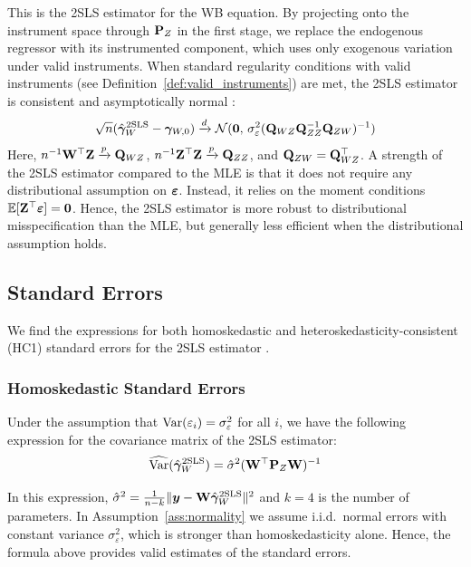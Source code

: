 This is the 2SLS estimator for the WB equation. By projecting onto the instrument space through $\mathbf{P}_Z$ in the first stage, we replace the endogenous regressor with its instrumented component, which uses only exogenous variation under valid instruments. When standard regularity conditions with valid instruments (see Definition~\ref{def:valid_instruments}) are met, the 2SLS estimator is consistent and asymptotically normal \parencite[Sec.~4.2.1]{Angrist2009}:
\begin{equation}
    \sqrt{n}(\hat{\bm{\gamma}}_W^{\text{2SLS}} - \bm{\gamma}_{W,0}) \xrightarrow{d} \mathcal{N}(\bm{0},\, \sigma_\varepsilon^2(\mathbf{Q}_{WZ}\mathbf{Q}_{ZZ}^{-1}\mathbf{Q}_{ZW})^{-1})
\end{equation}
Here, $n^{-1}\mathbf{W}^\top\mathbf{Z} \xrightarrow{p} \mathbf{Q}_{WZ}$, $n^{-1}\mathbf{Z}^\top\mathbf{Z} \xrightarrow{p} \mathbf{Q}_{ZZ}$, and $\mathbf{Q}_{ZW} = \mathbf{Q}_{WZ}^\top$. A strength of the 2SLS estimator compared to the MLE is that it does not require any distributional assumption on $\bm{\varepsilon}$. Instead, it relies on the moment conditions $\mathbb{E}[\mathbf{Z}^\top\bm{\varepsilon}] = \bm{0}$. Hence, the 2SLS estimator is more robust to distributional misspecification than the MLE, but generally less efficient when the distributional assumption holds.

\subsection{Standard Errors}

We find the expressions for both homoskedastic and heteroskedasticity-consistent (HC1) standard errors for the 2SLS estimator \parencite[Sec.~8.1, p.~299]{Angrist2009}.

\subsubsection{Homoskedastic Standard Errors}

Under the assumption that $\operatorname{Var}(\varepsilon_i) = \sigma_\varepsilon^2$ for all $i$, we have the following expression for the covariance matrix of the 2SLS estimator:
\begin{equation}
    \widehat{\operatorname{Var}}(\hat{\bm{\gamma}}_W^{\text{2SLS}}) =
    \hat\sigma^2(\mathbf{W}^\top\mathbf{P}_Z\mathbf{W})^{-1}
\end{equation}

In this expression, $\hat\sigma^2 = \frac{1}{n-k}\|\bm{y} - \mathbf{W}\hat{\bm{\gamma}}_W^{\text{2SLS}}\|^2$ and $k = 4$ is the number of parameters. In Assumption~\ref{ass:normality} we assume i.i.d.\ normal errors with constant variance $\sigma_\varepsilon^2$, which is stronger than homoskedasticity alone. Hence, the formula above provides valid estimates of the standard errors.

